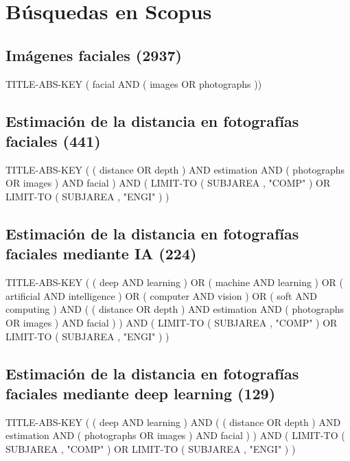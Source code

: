 \section*{Búsquedas en Scopus}

\subsection*{Imágenes faciales (2937)}
	
TITLE-ABS-KEY ( facial AND ( images OR photographs ))

\subsection*{Estimación de la distancia en fotografías faciales (441)}
	
TITLE-ABS-KEY ( ( distance OR depth ) AND estimation AND ( photographs OR images ) AND facial ) AND ( LIMIT-TO ( SUBJAREA , "COMP" ) OR LIMIT-TO ( SUBJAREA , "ENGI" ) )

\subsection*{Estimación de la distancia en fotografías faciales mediante IA (224)}

TITLE-ABS-KEY ( ( deep AND learning ) OR ( machine AND learning ) OR ( artificial AND intelligence ) OR ( computer AND vision ) OR ( soft AND computing ) AND ( ( distance OR depth ) AND estimation AND ( photographs OR images ) AND facial ) ) AND ( LIMIT-TO ( SUBJAREA , "COMP" ) OR LIMIT-TO ( SUBJAREA , "ENGI" ) )

\subsection*{Estimación de la distancia en fotografías faciales mediante deep learning (129)}
	
TITLE-ABS-KEY ( ( deep AND learning ) AND ( ( distance OR depth ) AND estimation AND ( photographs OR images ) AND facial ) ) AND ( LIMIT-TO ( SUBJAREA , "COMP" ) OR LIMIT-TO ( SUBJAREA , "ENGI" ) )
	
